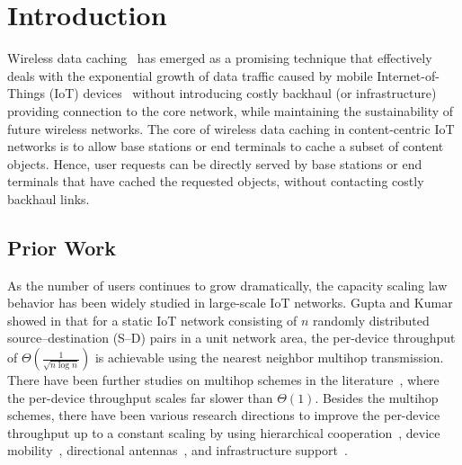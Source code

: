 \documentclass[10pt,journal,compsoc,onecolumn]{IEEEtran}
\begin{document}
%
\IEEEpeerreviewmaketitle
\section{Introduction}
Wireless data
caching~\cite{singlehop} has emerged as a promising technique
that effectively deals with the exponential growth of data traffic caused by mobile Internet-of-Things (IoT) devices~\cite{surv,acc1,acc2} without introducing costly backhaul (or infrastructure) providing
connection to the core network, while maintaining the sustainability of future wireless networks. 
The core of wireless
data caching in content-centric IoT networks is to allow base stations or end terminals to cache a subset of content objects. Hence, user requests can be
directly served by base stations or end terminals that have cached the requested objects, without contacting costly backhaul links.

\subsection{Prior Work}
As the number of users continues to grow dramatically, the
capacity scaling law behavior has been widely studied in
large-scale IoT networks. Gupta and Kumar showed in \cite{c8} that for
a static IoT network consisting of $n$ randomly distributed
source--destination (S--D) pairs in a unit network area, the
per-device throughput of $\Theta\left(\frac{1}{\sqrt{n \log
n}}\right)$ is achievable using the nearest neighbor multihop
transmission. There have been further studies on multihop schemes
in the literature~\cite{Franceschetti,GuptaKumar2003,Xue,Shin},
where the per-device throughput scales far slower than $\Theta(1)$.
Besides the multihop schemes, there have been various research
directions to improve the per-device throughput up to a constant
scaling by using hierarchical cooperation~\cite{c11}, device mobility~\cite{c12,c1}, directional
antennas~\cite{Zhang,Li,Yoon}, and infrastructure
support~\cite{Liu,Shin11}.
\end{document}
